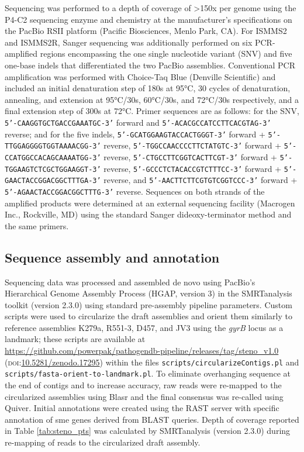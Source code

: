 Sequencing was performed to a depth of coverage of >150x per genome using the P4-C2 sequencing enzyme and chemistry at the manufacturer’s specifications on the PacBio RSII platform (Pacific Biosciences, Menlo Park, CA). For ISMMS2 and ISMMS2R, Sanger sequencing was additionally performed on six PCR-amplified regions encompassing the one single nucleotide variant (SNV) and five one-base indels that differentiated the two PacBio assemblies. Conventional PCR amplification was performed with Choice-Taq Blue (Denville Scientific) and included an initial denaturation step of 180s at 95°C, 30 cycles of denaturation, annealing, and extension at 95°C/30s, 60°C/30s, and 72°C/30s respectively, and a final extension step of 300s at 72°C. Primer sequences are as follows: for the SNV, \texttt{5’-CAAGGTGCTGACCGAAATGC-3’} forward and \texttt{5’-ACACGCCATCCTTCACGTAG-3’} reverse; and for the five indels, \texttt{5’-GCATGGAAGTACCACTGGGT-3’} forward + \texttt{5’-TTGGAGGGGTGGTAAAACGG-3’} reverse, \texttt{5’-TGGCCAACCCCTTCTATGTC-3’} forward + \texttt{5’-CCATGGCCACAGCAAAATGG-3’} reverse, \texttt{5’-CTGCCTTCGGTCACTTCGT-3’} forward + \texttt{5’-TGGAAGTCTCGCTGGAAGGT-3’} reverse, \texttt{5’-GCCCTCTACACCGTCTTTCC-3’} forward + \texttt{5’-GAACTACCGGACGGCTTTGA-3’} reverse, and \texttt{5’-AACTTCTTCGTGTCGGTCCC-3’} forward + \texttt{5’-AGAACTACCGGACGGCTTTG-3’} reverse. Sequences on both strands of the amplified products were determined at an external sequencing facility (Macrogen Inc., Rockville, MD) using the standard Sanger dideoxy-terminator method and the same primers.

\subsection{Sequence assembly and annotation}

Sequencing data was processed and assembled de novo using PacBio’s Hierarchical Genome Assembly Process\autocite{Chin2013} (HGAP, version 3) in the SMRTanalysis toolkit (version 2.3.0) using standard pre-assembly pipeline parameters. Custom scripts were used to circularize the draft assemblies and orient them similarly to reference assemblies K279a, R551-3, D457, and JV3 using the \emph{gyrB} locus as a landmark; these scripts are available at \url{https://github.com/powerpak/pathogendb-pipeline/releases/tag/steno\_v1.0} (\textsc{doi}:\href{http://dx.doi.org/10.5281/zenodo.17295}{10.5281/zenodo.17295}) within the files \texttt{scripts/circularizeContigs.pl} and \texttt{scripts/fasta-orient-to-landmark.pl}. To eliminate overhanging sequence at the end of contigs and to increase accuracy, raw reads were re-mapped to the circularized assemblies using Blasr and the final consensus was re-called using Quiver. Initial annotations were created using the RAST server\autocite{Overbeek2014} with specific annotation of sme genes derived from BLAST queries.
Depth of coverage reported in Table \ref{tab:steno_pts} was calculated by SMRTanalysis (version 2.3.0) during re-mapping of reads to the circularized draft assembly.

